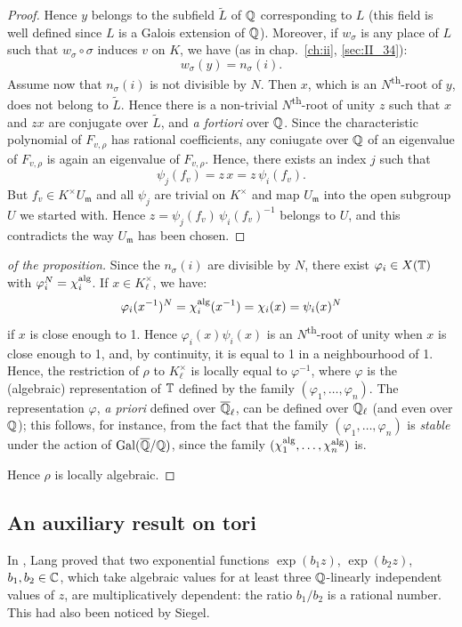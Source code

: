 \begin{proof}
	Hence $y$ belongs to the subfield $\widetilde{L}$ of $\mathbb{Q}$ corresponding
	to $L$ (this field is well defined since $L$ is a Galois extension of
	$\mathbb{Q}$).  Moreover, if $w_\sigma$ is any place of $L$ such that $w_\sigma
	\circ \sigma$ induces $v$ on $K$, we have (as in chap.~\ref{ch:ii},
	\ref{sec:II_34}):
	\[
		w_\sigma(y) = n_\sigma(i).
	\]
	Assume now that $n_\sigma(i)$ is not divisible by $N$. Then $x$, which
	is an $N$\textsuperscript{th}-root of $y$, does not belong to
	$\widetilde{L}$. Hence there is a
	\dpage
	non-trivial $N$\textsuperscript{th}-root of unity $z$ such that $x$ and
	$zx$ are conjugate over $\widetilde{L}$, and \emph{a fortiori} over
	$\mathbb{Q}$. Since the characteristic polynomial of $F_{v, \rho}$ has rational
	coefficients, any coniugate over $\mathbb{Q}$ of an eigenvalue of $F_{v, \rho}$
	is again an eigenvalue of $F_{v, \rho}$. Hence, there exists an index
	$j$ such that
	\[
		\psi_j(f_v) = z\, x = z\, \psi_i(f_v).
	\]
	But $f_v \in K^\times U_{\mathfrak{m}}$ and all $\psi_j$ are trivial on
	$K^\times$ and map $U_{\mathfrak{m}}$ into the open subgroup $U$ we
	started with. Hence $z = \psi_j(f_v) \, \psi_i(f_v)^{-1}$ belongs to
	$U$, and this contradicts the way $U_{\mathfrak{m}}$ has been chosen.
\end{proof}

\begin{proof}[ of the proposition]
	Since the $n_\sigma(i)$ are divisible by $N$, there exist $\varphi_i
	\in X(\mathbb{T})$ with $\varphi_i^N = \chi_i^{\rm alg}$. If $x \in
	K_\ell^\times$, we have:
	\[
		\varphi_i(x^{-1})^N = \chi_i^{\rm alg}(x^{-1}) = \chi_i(x) =
		\psi_i(x)^N
	\]
	if $x$ is close enough to 1. Hence $\varphi_i(x) \psi_i(x)$ is an
	$N$\textsuperscript{th}-root of unity when $x$ is close enough to 1,
	and, by continuity, it is equal to 1 in a neighbourhood of 1. Hence,
	the restriction of $\rho$ to $K_\ell^\times$ is locally equal to
	$\varphi^{-1}$, where $\varphi$ is the (algebraic) representation of
	$\mathbb{T}$ defined by the family $(\varphi_1, \dots, \varphi_n)$. The
	representation $\varphi$, \emph{a priori} defined over $\overline{\mathbb{Q}}_\ell$,
	can be defined over $\mathbb{Q}_\ell$ (and even over $\mathbb{Q}$); this follows, for
	instance, from the fact that the family $(\varphi_1, \dots, \varphi_n)$
	is \emph{stable} under the action of $\operatorname{Gal}(\overline{\mathbb{Q}}/\mathbb{Q})$, since the
	family $(\chi_1^{\rm alg}, \dots, \chi_n^{\rm alg})$ is.

	Hence $\rho$ is locally algebraic.
\end{proof}

\subsection{An auxiliary result on tori}
\label{sec:III_33}
In \cite{15}, Lang proved that two exponential functions $\exp(b_1 z)$,
$\exp(b_2z)$, $b_1, b_2 \in \mathbb{C}$, which take algebraic values for at least three
$\mathbb{Q}$-linearly independent values of $z$, are multiplicatively dependent: the
ratio $b_1/b_2$ is a rational number. This had also been noticed by Siegel.

